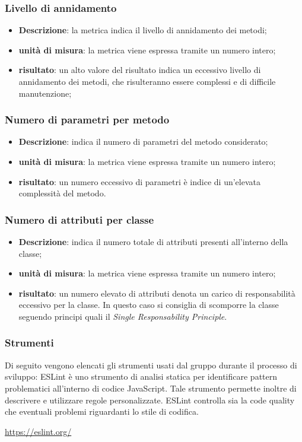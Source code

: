 	\subsubsection*{Livello di annidamento}
	\begin{itemize}
		\item{\textbf{Descrizione}}: la metrica indica il livello di annidamento dei metodi; 
		\item{\textbf{unità di misura}}: la metrica viene espressa tramite un numero intero; 
		\item{\textbf{risultato}}: un alto valore del risultato indica un eccessivo livello di annidamento dei metodi, che risulteranno essere complessi e di difficile manutenzione; 
	\end{itemize}

	\subsubsection*{Numero di parametri per metodo}
	\begin{itemize}
		\item{\textbf{Descrizione}}: indica il numero di parametri del metodo considerato; 
		\item{\textbf{unità di misura}}: la metrica viene espressa tramite un numero intero;  
		\item{\textbf{risultato}}: un numero eccessivo di parametri è indice di un'elevata complessità del metodo.
	\end{itemize}

	\subsubsection*{Numero di attributi per classe}
	\begin{itemize}
		\item{\textbf{Descrizione}}: indica il numero totale di attributi presenti all'interno della classe; 
		\item{\textbf{unità di misura}}: la metrica viene espressa tramite un numero intero; 
		\item{\textbf{risultato}}: un numero elevato di attributi denota un carico di responsabilità eccessivo per la classe. In questo caso si consiglia di scomporre la classe seguendo principi quali il \textit{Single Responsability Principle}. 
	\end{itemize}            

\subsubsection{Strumenti}
Di seguito vengono elencati gli strumenti usati dal gruppo durante il processo di sviluppo:
	ESLint è uno strumento di analisi statica per identificare pattern problematici all'interno di codice JavaScript. Tale strumento permette inoltre di descrivere e utilizzare regole personalizzate. ESLint controlla sia la code quality che eventuali problemi riguardanti lo stile di codifica.
	\begin{center}
		\url{https://eslint.org/}
	\end{center}
	
